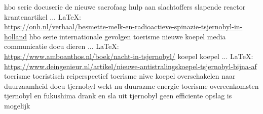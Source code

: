 \begin{thebibliography}{99}
{{{{{{{							hbo serie
							docuserie
							de  nieuwe sacrofaag
							hulp aan slachtoffers
							slapende reactor
							krantenartikel
							 ... \LaTeX:\\ \url{https://onh.nl/verhaal/besmette-melk-en-radioactieve-spinazie-tsjernobyl-in-holland}
							hbo serie
							internationale gevolgen
							toerisme
							nieuwe koepel
							media communicatie
							docu
							dieren
							 ... \LaTeX:\\ \url{https://www.amboanthos.nl/boek/nacht-in-tsjernobyl/}
							koepel
							koepel
							 ... \LaTeX:\\ \url{https://www.deingenieur.nl/artikel/nieuwe-antistralingskoepel-tsjernobyl-bijna-af}
							toerisme
							toeristisch reiperspectief
							toerisme
							niwe koepel
							overschakelen naar duurzaamheid
							docu
							tjernobyl wekt nu duurazme energie
							toerisme
							overeenkomsten tjernobyl en fukushima
							drank en sla uit tjernobyl
							geen efficiente opslag is mogelijk
							
}}}}}}}
\end{thebibliography}
